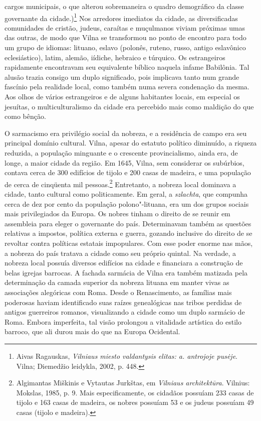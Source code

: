 cargos municipais, o que alterou sobremaneira o quadro demográfico da
classe governante da cidade.)\footnote{Aivas Ragauskas, \textit{Vilniaus miesto valdantysis elitas:  a. antrojoje pusėje}. Vilna; Diemedžio leidykla, 2002, p. 448.}
Nos arredores imediatos da cidade, as diversificadas comunidades de
cristão, judeus, caraítas e muçulmanos viviam próximas umas das outras,
de modo que Vilna se transformou no ponto de encontro para todo um grupo
de idiomas: lituano, eslavo (polonês, ruteno, russo, antigo eslavônico
eclesiástico), latim, alemão, iídiche, hebraico e túrquico. Os
estrangeiros rapidamente encontravam seu equivalente bíblico naquela
infame Babilônia. Tal alusão trazia consigo um duplo significado, pois
implicava tanto num grande fascínio pela realidade local, como também
numa severa condenação da mesma. Aos olhos de vários estrangeiros e de
alguns habitantes locais, em especial os jesuítas, o multiculturalismo
da cidade era percebido mais como maldição do que como bênção.

O sarmacismo era privilégio social da nobreza, e a residência de campo
era seu principal domínio cultural. Vilna, apesar do estatuto político
diminuído, a riqueza reduzida, a população minguante e o crescente
provincialismo, ainda era, de longe, a maior cidade da região. Em 1645,
Vilna, sem considerar os subúrbios, contava cerca de 300 edifícios de
tijolo e 200 casas de madeira, e uma população de cerca de cinqüenta mil
pessoas.\footnote{Algimantas Miškinis e Vytautas Jurkštas, em \textit{Vilniaus architektūra}. Vilnius: Mokslas, 1985, p. 9. Mais especificamente, os cidadãos possuíam 233 casas de tijolo e 163 casas de madeira, os nobres possuíam 53 e os judeus possuíam 49 casas (tijolo e madeira).} Entretanto, a nobreza local dominava a cidade, tanto cultural como politicamente. Em geral, a \textit{szlachta}, que
compunha cerca de dez por cento da população polono"-lituana, era um dos
grupos sociais mais privilegiados da Europa. Os nobres tinham o direito
de se reunir em assembleia para eleger o governante do país.
Determinavam também as questões relativas a impostos, política externa e
guerra, gozando inclusive do direito de se revoltar contra políticas
estatais impopulares. Com esse poder enorme nas mãos, a nobreza do país
tratava a cidade como seu próprio quintal. Na verdade, a nobreza local
possuía diversos edifícios na cidade e financiara a construção de belas
igrejas barrocas. A fachada sarmácia de Vilna era também matizada pela
determinação da camada superior da nobreza lituana em manter vivas as
associações alegóricas com Roma. Desde o Renascimento, as famílias mais
poderosas haviam identificado suas raízes genealógicas nas tribos
perdidas de antigos guerreiros romanos, visualizando a cidade como um
duplo sarmácio de Roma. Embora imperfeita, tal visão prolongou a
vitalidade artística do estilo barroco, que ali durou mais do que na
Europa Ocidental.

